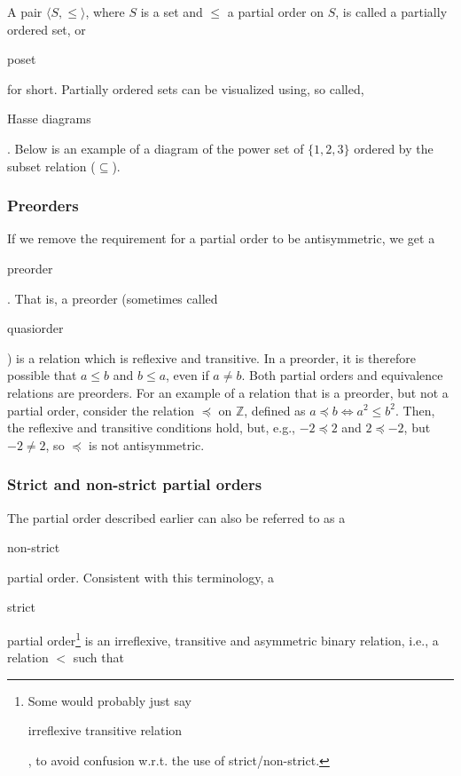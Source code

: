 \documentclass[11pt]{article}
\theoremstyle{plain}
\theoremstyle{definition}
\begin{document}
\noindent A pair $ \langle S, \le \rangle $, where $ S $ is a set and $ \le $ a partial order on $ S $, is called a partially ordered set, or \begin{em}poset\end{em} for short.
Partially ordered sets can be visualized using, so called, \begin{em}Hasse diagrams\end{em}. Below is an example of a diagram of the power set of $ \{ 1, 2, 3 \} $ ordered by the subset relation ($ \subseteq $).

\begin{center}
  \def\svgwidth{0.3\columnwidth}
  
\end{center}


\subsubsection*{Preorders}

\noindent If we remove the requirement for a partial order to be antisymmetric, we get a \begin{em}preorder\end{em}. That is, a preorder (sometimes called \begin{em}quasiorder\end{em}) is a relation which is reflexive and transitive.
In a preorder, it is therefore possible that $ a \le b $ and $ b \le a $, even if $ a \ne b $.
Both partial orders and equivalence relations are preorders.
For an example of a relation that is a preorder, but not a partial order, consider the relation $ \preceq $ on $ \mathbb{Z} $, defined as $ a \preceq b \iff a^2 \le b^2 $.
Then, the reflexive and transitive conditions hold, but, e.g., $ -2 \preceq 2 $ and $ 2 \preceq -2 $, but $ -2 \ne 2 $, so $ \preceq $ is not antisymmetric. \\

\begin{center}
  \def\svgwidth{0.5\columnwidth}
  
\end{center}

\subsubsection*{Strict and non-strict partial orders}

The partial order described earlier can also be referred to as a \begin{em}non-strict\end{em} partial order. Consistent with this terminology, a \begin{em}strict\end{em} partial order\footnote[1]{Some would probably just say \begin{em}irreflexive transitive relation\end{em}, to avoid confusion w.r.t. the use of strict/non-strict.} is an irreflexive, transitive and asymmetric binary relation, i.e., a relation $ < $ such that
\end{document}
